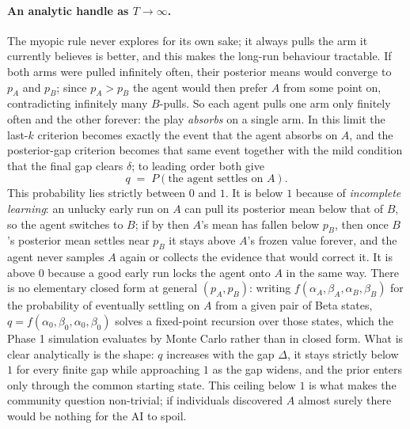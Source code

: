 \documentclass[12pt]{article}
\begin{document}
\paragraph{An analytic handle as $T \to \infty$.}
The myopic rule never explores for its own sake; it always pulls the arm it currently believes is better, and this makes the long-run behaviour tractable. If both arms were pulled infinitely often, their posterior means would converge to $p_A$ and $p_B$; since $p_A > p_B$ the agent would then prefer $A$ from some point on, contradicting infinitely many $B$-pulls. So each agent pulls one arm only finitely often and the other forever: the play \emph{absorbs} on a single arm. In this limit the last-$k$ criterion becomes exactly the event that the agent absorbs on $A$, and the posterior-gap criterion becomes that same event together with the mild condition that the final gap clears $\delta$; to leading order both give
\[
  q \;=\; P(\text{the agent settles on } A).
\]
This probability lies strictly between $0$ and $1$. It is below $1$ because of \emph{incomplete learning}: an unlucky early run on $A$ can pull its posterior mean below that of $B$, so the agent switches to $B$; if by then $A$'s mean has fallen below $p_B$, then once $B$'s posterior mean settles near $p_B$ it stays above $A$'s frozen value forever, and the agent never samples $A$ again or collects the evidence that would correct it. It is above $0$ because a good early run locks the agent onto $A$ in the same way. There is no elementary closed form at general $(p_A, p_B)$: writing $f(\alpha_A, \beta_A, \alpha_B, \beta_B)$ for the probability of eventually settling on $A$ from a given pair of Beta states, $q = f(\alpha_0, \beta_0, \alpha_0, \beta_0)$ solves a fixed-point recursion over those states, which the Phase 1 simulation evaluates by Monte Carlo rather than in closed form. What is clear analytically is the shape: $q$ increases with the gap $\Delta$, it stays strictly below $1$ for every finite gap while approaching $1$ as the gap widens, and the prior enters only through the common starting state. This ceiling below $1$ is what makes the community question non-trivial; if individuals discovered $A$ almost surely there would be nothing for the AI to spoil.
\end{document}
